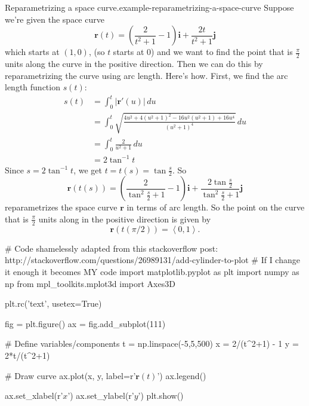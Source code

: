 \documentclass[10pt,]{book}
\numberwithin{equation}{section}
\newcommand{\vv}[1]{\mathbf{#1}}
\newcommand{\dotprod}[1]{\left\langle #1 \right\rangle}
\begin{document}
\begin{example}{Reparametrizing a space curve.}{example-reparametrizing-a-space-curve}%
\hypertarget{p-1281}{}%
Suppose we're given the space curve%
%
\begin{equation*}
\vv{r}(t) = \left(\frac{2}{t^{2}+1}-1\right)\vv{i}+\frac{2t}{t^{2}+1}\vv{j}
\end{equation*}
\hypertarget{p-1282}{}%
which starts at \((1,0)\), (so \(t\) starts at \(0\)) and we want to find the point that is \(\frac{\pi}{2}\) units along the curve in the positive direction. Then we can do this by reparametrizing the curve using arc length. Here's how. First, we find the arc length function \(s(t)\):%
%
\begin{align*}
s(t) & = \int_{0}^{t}|\vv{r}'(u)|\,du \\
& = \int_{0}^{t} \sqrt{\frac{4u^{2}+4(u^{2}+1)^{2}-16u^{2}(u^{2}+1)+16u^{4}}{(u^{2}+1)^{4}}}\,du \\
& = \int_{0}^{t} \frac{2}{u^{2}+1}\,du \\
& = 2\tan^{-1}t 
\end{align*}
\hypertarget{p-1283}{}%
Since \(s = 2\tan^{-1}t\), we get \(t = t(s) = \tan\frac{s}{2}\). So%
%
\begin{equation*}
\vv{r}(t(s)) = \left(\frac{2}{\tan^{2}\frac{s}{2}+1}-1\right)\vv{i}+\frac{2\tan\frac{s}{2}}{\tan^{2}\frac{s}{2}+1}\vv{j}
\end{equation*}
\hypertarget{p-1284}{}%
reparametrizes the space curve \(\vv{r}\) in terms of arc length. So the point on the curve that is \(\frac{\pi}{2}\) units along in the positive direction is given by%
%
\begin{equation*}
\vv{r}(t(\pi/2)) = \dotprod{0,1}.
\end{equation*}
\end{example}
\begin{sageinput}
# Code shamelessly adapted from this stackoverflow post: http://stackoverflow.com/questions/26989131/add-cylinder-to-plot
# If I change it enough it becomes MY code
import matplotlib.pyplot as plt
import numpy as np
from mpl_toolkits.mplot3d import Axes3D

plt.rc('text', usetex=True)

fig = plt.figure()
ax = fig.add_subplot(111)

# Define variables/components
t = np.linspace(-5,5,500)
x = 2/(t^2+1) - 1
y = 2*t/(t^2+1)

# Draw curve
ax.plot(x, y, label=r'$\mathbf{r}(t)$')
ax.legend()

ax.set_xlabel(r'$x$')
ax.set_ylabel(r'$y$')
plt.show()
\end{sageinput}
%
%
\typeout{************************************************}
\typeout{************************************************}
%
\end{document}
